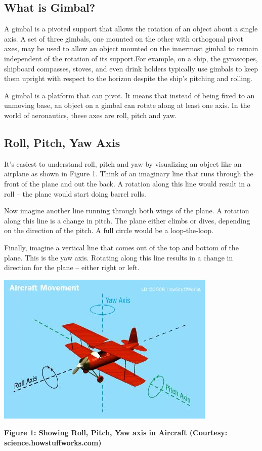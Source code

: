 \documentclass[11pt,a4paper]{article}
\begin{document}
		\subsection{What is Gimbal?}
		A gimbal is a pivoted support that allows the rotation of an object about a single axis. A set of three gimbals, one mounted on the other with orthogonal pivot axes, may be used to allow an object mounted on the innermost gimbal to remain independent of the rotation of its support.For example, on a ship, the gyroscopes, shipboard compasses, stoves, and even drink holders typically use gimbals to keep them upright with respect to the horizon despite the ship's pitching and rolling.
		
		A gimbal is a platform that can pivot. It means that instead of being fixed to an unmoving base, an object on a gimbal can rotate along at least one axis. In the world of aeronautics, these axes are roll, pitch and yaw.
		
		\subsection{Roll, Pitch, Yaw Axis}
		It's easiest to understand roll, pitch and yaw by visualizing an object like an airplane as shown in Figure 1. Think of an imaginary line that runs through the front of the plane and out the back. A rotation along this line would result in a roll -- the plane would start doing barrel rolls.
		
		Now imagine another line running through both wings of the plane. A rotation along this line is a change in pitch. The plane either climbs or dives, depending on the direction of the pitch. A full circle would be a loop-the-loop.
		
		Finally, imagine a vertical line that comes out of the top and bottom of the plane. This is the yaw axis. Rotating along this line results in a change in direction for the plane -- either right or left.
		\newline
		\newline
		\begin{center}
			\includegraphics{../Images/Aircraft_Movement.JPG}
		\end{center}
		\begin{center}
			\textbf{Figure 1: Showing Roll, Pitch, Yaw axis in Aircraft (Courtesy: science.howstuffworks.com)}
		\end{center}
		
\end{document}
